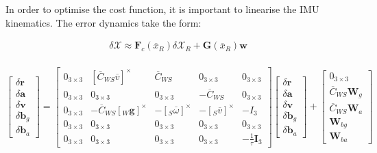 \documentclass[11pt,twoside]{report}
\begin{document}
In order to optimise the cost function, it is important to linearise the IMU kinematics. The error dynamics take the form:

\begin{equation}
\begin{aligned}
\delta \mathcal{X} \approx  \textbf{F}_{c} (\overline{x}_{R}) \delta \mathcal{X}_{R} + \textbf{G}(\overline{x}_{R})\textbf{w} \\
\end{aligned}
\end{equation}

\begin{equation}
\begin{bmatrix}
\delta \textbf{\.r}  \\[0.3em]
\delta \textbf{\.a} \\[0.3em]
\delta \textbf{\.v} \\[0.3em]
\delta \textbf{\.b}_{g} \\[0.3em]
\delta \textbf{\.b}_{a}
\end{bmatrix}
=
\begin{bmatrix}
0_{3 \times 3} &  [\overline{C}_{WS}\overline{v}]^{\times}
& \overline{C}_{WS} &  0_{3 \times 3} &  0_{3 \times 3}\\

0_{3 \times 3} & 0_{3 \times 3} 
& 0_{3 \times 3} &  -\overline{C}_{WS} &  0_{3 \times 3}\\

0_{3 \times 3} & -\overline{C}_{WS}[_{W}\textbf{g}]^{\times}
& -[_{S}\overline{\omega}]^{\times} &  -[_{S}\overline{v}]^{\times} &  -I_{3}\\

0_{3 \times 3} & 0_{3 \times 3}
& 0_{3 \times 3} &  0_{3 \times 3} &  0_{3 \times 3}\\

0_{3 \times 3} & 0_{3 \times 3} 
& 0_{3 \times 3} &  0_{3 \times 3} &  -\frac{1}{\tau}\textbf{I}_{3}
\end{bmatrix}
\begin{bmatrix}
\delta \textbf{r}  \\[0.3em]
\delta \textbf{a} \\[0.3em]
\delta \textbf{v} \\[0.3em]
\delta \textbf{b}_{g} \\[0.3em]
\delta \textbf{b}_{a}
\end{bmatrix}
+
\begin{bmatrix}
0_{3 \times 3}  \\[0.3em]
\overline{C}_{WS} \textbf{W}_{g} \\[0.3em]
\overline{C}_{WS} \textbf{W}_{a} \\[0.3em]
\textbf{W}_{bg} \\[0.3em]
\textbf{W}_{ba}
\end{bmatrix}
\end{equation}
\end{document}
